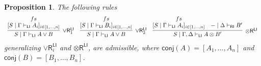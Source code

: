 \documentclass[submission,copyright,creativecommons]{eptcs}
\newtheorem{proposition}[theorem]{Proposition}
\theoremstyle{definition}
\newcommand{\tr}{\otimes \mathsf{R}}
\newcommand{\orrone}{\lor \mathsf{R}_{1}}
\newcommand{\orrtwo}{\lor \mathsf{R}_{2}}
\newcommand{\orri}{\lor \mathsf{R}_{i}}
\newcommand{\ot}{\otimes}
\newcommand{\RI}{\mathsf{RI}}
\newcommand{\LI}{\mathsf{LI}}
\newcommand{\conj}[1]{\mathsf{conj} (#1)}
\begin{document}
\begin{proposition}\label{prop:GenRightRules}
  The following rules
  \begin{displaymath}
    \begin{array}{c}
      \infer[\orrone^{\LI}]{S \mid \Gamma \vdash_{\LI} A \lor B}{
        \deduce{[S \mid \Gamma \vdash_{\LI} A_i]_{i \in [1 , \dots , n]}}{fs}
      }
      \quad
      \infer[\orrtwo^{\LI}]{S \mid \Gamma \vdash_{\LI} A \lor B}{
        \deduce{[S \mid \Gamma \vdash_{\LI} B_i]_{i \in [1 , \dots , n]}}{fs}
      }
      \quad
      \infer[\tr^{\LI}]{S \mid \Gamma , \Delta \vdash_{\LI} A \ot B'}{
        \deduce{[S \mid \Gamma \vdash_{\LI} A_i]_{i \in [1 , \dots , n]}}{fs}
        &
        - \mid \Delta \vdash_{\RI} B'
      }
    \end{array}
  \end{displaymath}
  generalizing $\orri^{\LI}$ and $\tr^{\LI}$, are admissible, where $\conj{A} = [A_1 , \dots , A_n]$ and $\conj{B} = [B_1 , \dots , B_n]$.
\end{proposition}
\end{document}
